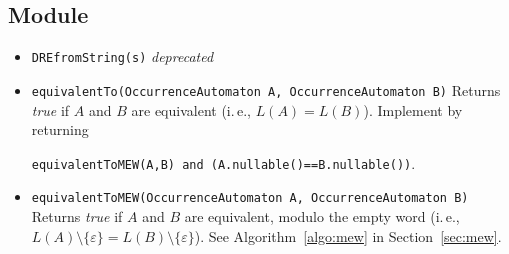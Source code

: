 \documentclass[a4paper,11pt, svgnames,titlepage]{article}
\newcommand{\emptyword}{\varepsilon}
\DeclareMathOperator{\incomp}{\#}
\begin{document}
\subsection{Module}\label{sec:des:mod}
\begin{itemize}
	\item\texttt{DREfromString(s)} \emph{deprecated}
\item\texttt{equivalentTo(OccurrenceAutomaton A, OccurrenceAutomaton B)} Returns \emph{true} if $A$ and $B$ are equivalent (i.\,e., $L(A)=L(B)$). Implement by returning 
\begin{center}
	\texttt{equivalentToMEW(A,B) and (A.nullable()==B.nullable())}.
\end{center}
\item\texttt{equivalentToMEW(OccurrenceAutomaton A, OccurrenceAutomaton B)} Returns \emph{true} if $A$ and $B$ are equivalent, modulo the empty word (i.\,e., $L(A)\setminus\{\emptyword\}=L(B)\setminus\{\emptyword\}$). See Algorithm~\ref{algo:mew} in Section~\ref{sec:mew}.

\end{itemize}
\end{document}
